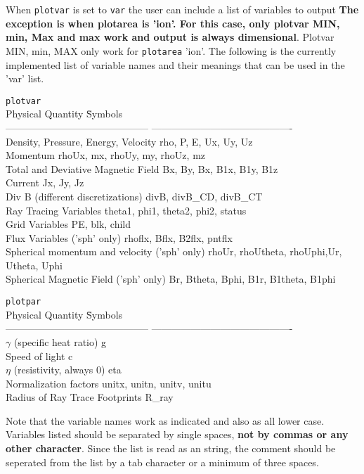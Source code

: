 When {\tt plotvar} is set to {\tt var} the user can include a list of
variables to output {\bf The exception is when plotarea is 'ion'.  For
this case, only plotvar MIN, min, Max and max work and output is always
dimensional}.  Plotvar
MIN, min, MAX only work for {\tt plotarea} 'ion'.  The following is 
the currently 
implemented list of variable names and their meanings that can be used
in the 'var' list.
\begin{tabbing}
{\tt plotvar}\\
Physical Quantity                    \hspace{2.0in} \= Symbols \\
--------------------------------------------  \>
 ------------------------------------------- \\
Density, Pressure, Energy, Velocity   \> rho, P, E, Ux, Uy, Uz        \\
Momentum                              \> rhoUx, mx, rhoUy, my, rhoUz, mz \\
Total and Deviative Magnetic Field    \> Bx, By, Bx, B1x, B1y, B1z   \\
Current                               \> Jx, Jy, Jz \\
Div B (different discretizations)     \> divB, divB\_CD, divB\_CT \\
Ray Tracing Variables                 \> theta1, phi1, theta2, phi2, status \\
Grid Variables                        \> PE, blk, child \\
Flux Variables ('sph' only)           \> rhoflx, Bflx, B2flx, pntflx \\
Spherical momentum and velocity ('sph' only)      \> rhoUr, rhoUtheta, rhoUphi,Ur, Utheta, Uphi \\
Spherical Magnetic Field ('sph' only)    \> Br, Btheta, Bphi, B1r, B1theta, B1phi
\end{tabbing}
\begin{tabbing}
{\tt plotpar}\\
Physical Quantity      \hspace{2.0in} \= Symbols \\
--------------------------------------------  \>
 ------------------------------------------- \\
$\gamma$ (specific heat ratio)        \> g   \\
Speed of light                        \> c   \\
$\eta$ (resistivity, always 0)        \> eta \\
Normalization factors                 \> unitx, unitn, unitv, unitu \\
Radius of Ray Trace Footprints        \> R\_ray 
\end{tabbing}
Note that the variable names work as indicated and also as all lower case.
Variables listed should be separated by single spaces, {\bf not by commas or any other
character}.  Since the list is read as an string, the comment should be seperated
from the list by a tab character or a minimum of three spaces.

